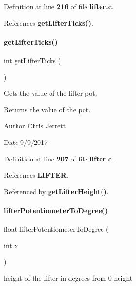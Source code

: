 Definition at line \textbf{ 216} of file \textbf{ lifter.\+c}.



References \textbf{ get\+Lifter\+Ticks()}.

\mbox{\label{lifter_8h_acdf909159b0406c48099843f2306be78}} 
\paragraph{get\+Lifter\+Ticks()}
{\footnotesize\ttfamily int get\+Lifter\+Ticks (\begin{DoxyParamCaption}{ }\end{DoxyParamCaption})}



Gets the value of the lifter pot. 

\begin{DoxyReturn}{Returns}
the value of the pot. 
\end{DoxyReturn}
\begin{DoxyAuthor}{Author}
Chris Jerrett 
\end{DoxyAuthor}
\begin{DoxyDate}{Date}
9/9/2017 
\end{DoxyDate}


Definition at line \textbf{ 207} of file \textbf{ lifter.\+c}.



References \textbf{ L\+I\+F\+T\+ER}.



Referenced by \textbf{ get\+Lifter\+Height()}.

\mbox{\label{lifter_8h_ab0460888f3213e5510bd25ae1e152a75}} 
\paragraph{lifter\+Potentiometer\+To\+Degree()}
{\footnotesize\ttfamily float lifter\+Potentiometer\+To\+Degree (\begin{DoxyParamCaption}\item[{int}]{x }\end{DoxyParamCaption})}



height of the lifter in degrees from 0 height 


